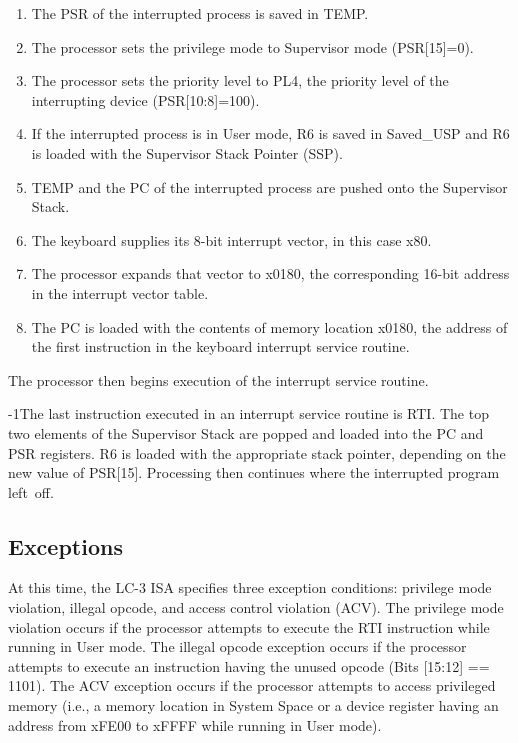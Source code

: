 \documentclass{patt}
\begin{document}
\bgroup
\begin{enumerate}
\item
The PSR of the interrupted process is saved in TEMP.
\item
The processor sets the privilege mode to Supervisor mode (PSR[15]=0).
\item
The processor sets the priority level to PL4, the priority level of the
interrupting device (PSR[10:8]=100).
\item
If the interrupted process is in User mode, R6 is saved in Saved\_USP and R6
is loaded with the Supervisor Stack Pointer (SSP).
\item
TEMP and the PC of the interrupted process are pushed onto the Supervisor
Stack.
\item
The keyboard supplies its 8-bit interrupt vector, in this case x80.
\item
The processor expands that vector to x0180, the corresponding 16-bit
address in the interrupt vector table.
\item
The PC is loaded with the contents of memory location x0180, the address of
the first instruction in the keyboard interrupt service routine.
\end{enumerate}
\egroup

 \noindent The processor then begins execution of the
interrupt service routine.

\looseness-1The last instruction executed in an interrupt service
routine is RTI. The top two elements of the Supervisor Stack are
popped and loaded into the PC and PSR registers. R6 is loaded with
the appropriate stack pointer, depending on the new value of
PSR[15]. Processing then continues where the interrupted program
left~off.

\vspace{-6pt}

\subsection{Exceptions}

At this time, the LC-3 ISA specifies three exception conditions: privilege
mode violation, illegal opcode, and access control violation (ACV).  
The privilege mode violation occurs if
the processor attempts to execute the RTI instruction while running in User 
mode.  The illegal opcode exception occurs if the processor attempts to 
execute an instruction having the unused opcode (Bits [15:12] == 1101).
The ACV exception occurs if the processor attempts to access privileged
memory (i.e., a memory location in System Space or a device register having
an address from xFE00 to xFFFF while running in User mode).
\end{document}
